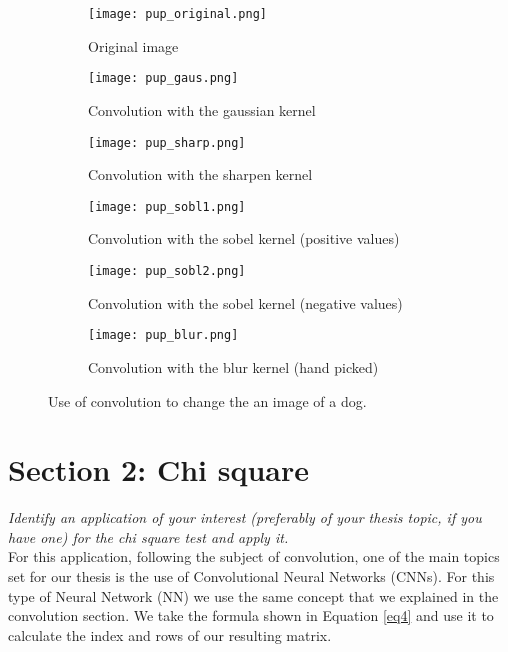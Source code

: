 \documentclass{article}
\begin{document}
\begin{figure}[]
\begin{subfigure}{.3\textwidth}
  \centering
  \texttt{[image: pup\_original.png]}  
  \caption{Original image}
  \label{sb2-1}
\end{subfigure}\hspace{5mm}%
\begin{subfigure}{.3\textwidth}
  \centering
  \texttt{[image: pup\_gaus.png]}  
  \caption{Convolution with the gaussian kernel}
  \label{sb2-2}
\end{subfigure}\hspace{5mm}%
\begin{subfigure}{.3\textwidth}
  \centering
  \texttt{[image: pup\_sharp.png]}  
  \caption{Convolution with the sharpen kernel}
  \label{sb2-3}
\end{subfigure}
\newline
\begin{subfigure}{.3\textwidth}
  \centering
  \texttt{[image: pup\_sobl1.png]}  
  \caption{Convolution with the sobel kernel (positive values) }
  \label{sb2-4}
\end{subfigure}\hspace{5mm}%
\begin{subfigure}{.3\textwidth}
  \centering
  \texttt{[image: pup\_sobl2.png]}  
  \caption{Convolution with the sobel kernel (negative values) }
  \label{sb2-5}
\end{subfigure}\hspace{5mm}%
\begin{subfigure}{.3\textwidth}
  \centering
  \texttt{[image: pup\_blur.png]}  
  \caption{Convolution with the blur kernel (hand picked)}
  \label{sb2-6}
\end{subfigure}
	\caption{Use of convolution to change the an image of a dog.}
\label{fig2}
\end{figure}

\section{Section 2: Chi square}
\textit{Identify an application of your interest (preferably of your thesis topic, if you have one) for the chi square test and apply it.} \\

For this application, following the subject of convolution, one of the main topics set for our thesis is the use of Convolutional Neural Networks (CNNs). For this type of Neural Network (NN) we use the same concept that we explained in the convolution section. We take the formula shown in Equation \ref{eq4} and use it to calculate the index and rows of our resulting matrix. \\
\end{document}

